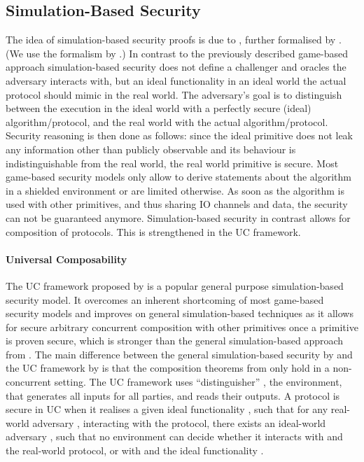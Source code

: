 \subsection{Simulation-Based Security}
The idea of simulation-based security proofs is due to \citet{Goldreich87}, further formalised by \citet{Canetti00}.
(We use the formalism by \citet{Goldreich2001,Goldreich2004}.)
In contrast to the previously described game-based approach simulation-based security does not define a challenger and oracles the adversary interacts with, but an ideal functionality in an ideal world the actual protocol should mimic in the real world.
The adversary's goal is to distinguish between the execution in the ideal world with a perfectly secure (ideal) algorithm/protocol, and the real world with the actual algorithm/protocol.
Security reasoning is then done as follows: since the ideal primitive does not leak any information other than publicly observable and its behaviour is indistinguishable from the real world, the real world primitive is secure.
Most game-based security models only allow to derive statements about the algorithm in a shielded environment or are limited otherwise.
As soon as the algorithm is used with other primitives, and thus sharing \ac{IO} channels and data, the security can not be guaranteed anymore.
Simulation-based security in contrast allows for composition of protocols.
This is strengthened in the \ac{UC} framework.

\paragraph{Universal Composability} \label{sec:uc-intro}
The \ac{UC} framework proposed by \citet{Canetti2001a} is a popular general purpose simulation-based security model.
It overcomes an inherent shortcoming of most game-based security models and improves on general simulation-based techniques as it allows for secure arbitrary concurrent composition with other primitives once a primitive is proven secure, which is stronger than the general simulation-based approach from \citet{Canetti00}.
The main difference between the general simulation-based security by \citet{Canetti00} and the \ac{UC} framework by \citet{Canetti2001a} is that the composition theorems from \citet{Canetti00} only hold in a non-concurrent setting.
The \ac{UC} framework uses ``distinguisher'' \UCZ, the environment, that generates all inputs for all parties, and reads their outputs.
A protocol is secure in \ac{UC} when it realises a given ideal functionality \UCF, such that for any real-world adversary \A, interacting with the protocol, there exists an ideal-world adversary \UCS, such that no environment \UCZ can decide whether it interacts with \A and the real-world protocol, or with \SIM and the ideal functionality \UCF.


